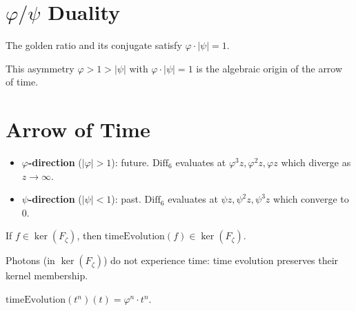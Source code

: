 \section{\texorpdfstring{$\varphi/\psi$}{φ/ψ} Duality}
\label{sec:mat_phi_psi_duality}

\begin{theorem}[$\varphi \cdot |\psi| = 1$]
\label{thm:mat_phi_psi}
\leanok
The golden ratio and its conjugate satisfy $\varphi \cdot |\psi| = 1$.
\end{theorem}

\begin{theorem}[$\varphi > 1$]
\label{thm:mat_phi_gt_one}
\leanok
\end{theorem}

\begin{theorem}[$|\psi| < 1$]
\label{thm:mat_psi_lt_one}
\leanok
\end{theorem}

This asymmetry $\varphi > 1 > |\psi|$ with $\varphi \cdot |\psi| = 1$ is the algebraic origin of the arrow of time.

\section{Arrow of Time}
\label{sec:mat_arrow_of_time}

\begin{itemize}
\item \textbf{$\varphi$-direction} ($|\varphi| > 1$): future. $\mathrm{Diff}_6$ evaluates at $\varphi^3 z, \varphi^2 z, \varphi z$ which diverge as $z \to \infty$.
\item \textbf{$\psi$-direction} ($|\psi| < 1$): past. $\mathrm{Diff}_6$ evaluates at $\psi z, \psi^2 z, \psi^3 z$ which converge to 0.
\end{itemize}

\begin{theorem}
\label{thm:mat_ker_invariance}
\leanok
If $f \in \ker(F_\zeta)$, then $\mathrm{timeEvolution}(f) \in \ker(F_\zeta)$.
\end{theorem}

Photons (in $\ker(F_\zeta)$) do not experience time: time evolution preserves their kernel membership.

\begin{theorem}
\label{thm:mat_amplification}
\leanok
$\mathrm{timeEvolution}(t^n)(t) = \varphi^n \cdot t^n$.
\end{theorem}

